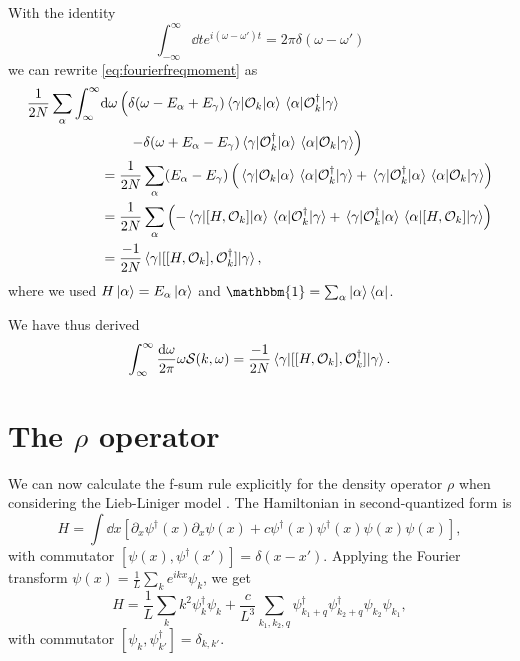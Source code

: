 \documentclass[11pt, a4paper]{report} %
\newcommand{\operator}{\mathcal{O}}
\begin{document}
With the identity
\begin{equation}
  \int_{-\infty}^{\infty} \dd t e^{i(\omega-\omega')t} = 2\pi \delta(\omega-\omega')
\end{equation}
we can rewrite \cref{eq:fourierfreqmoment} as 
\begin{align}
  \frac{1}{2N} \sum_{\alpha} \int_{\infty}^{\infty}&\dd \omega  \left(\delta(\omega-E_{\alpha}+E_{\gamma})\matrixel{\gamma}{\operator_k}{\alpha}\matrixel{\alpha}{\operator_{k}^{\dagger}}{\gamma}\right. \nonumber\\
&\qquad\left.- \delta(\omega+E_{\alpha}-E_{\gamma})\matrixel{\gamma}{\operator_{k}^{\dagger}}{\alpha}\matrixel{\alpha}{\operator_k}{\gamma}\right)\\
&=\frac{1}{2N} \sum_{\alpha} (E_{\alpha} - E_{\gamma}) \left(\matrixel{\gamma}{\operator_k}{\alpha}\matrixel{\alpha}{\operator_{k}^{\dagger}}{\gamma} + \matrixel{\gamma}{\operator_{k}^{\dagger}}{\alpha}\matrixel{\alpha}{\operator_k}{\gamma}\right)\\
&=\frac{1}{2N} \sum_{\alpha}  \left(-\matrixel{\gamma}{[H,\operator_k]}{\alpha}\matrixel{\alpha}{\operator_{k}^{\dagger}}{\gamma} + \matrixel{\gamma}{\operator_{k}^{\dagger}}{\alpha}\matrixel{\alpha}{[H,\operator_k]}{\gamma}\right)\\
&=\frac{-1}{2N} \matrixel{\gamma}{[[H,\operator_k],\operator_{k}^{\dagger}]}{\gamma},
\end{align}
where we used \(H\ket{\alpha}=E_{\alpha}\ket{\alpha}\) and \(\mathbbm{1}=\sum_{\alpha}\ket{\alpha}\bra{\alpha}\).

We have thus derived~\cite{Cauxfsum}
\begin{align}
  \int_{\infty}^{\infty}\frac{\dd \omega}{2\pi} \omega \mathcal{S}(k,\omega) = \frac{-1}{2N} \matrixel{\gamma}{[[H,\operator_k],\operator_{k}^{\dagger}]}{\gamma}.
\end{align}


\section{The $\rho$ operator}

\begin{sloppypar}
We can now calculate the f-sum rule explicitly for the density operator \(\rho\) when considering the Lieb-Liniger model \cite{Cauxfsum}.
The Hamiltonian in second-quantized form is \cite{Franchini2017} 
\begin{equation}
  \label{eq:1}
  H = \int \dd x \left[\partial_x\psi^{\dag}(x) \partial_{x} \psi(x) + c \psi^{\dag}(x)\psi^{\dag}(x)\psi(x)\psi(x)\right],
\end{equation}
with commutator \([\psi(x), \psi^{\dagger}(x')] = \delta(x-x')\).
Applying the Fourier transform \(\psi (x) = \frac{1}{L}\sum_{k} e^{ikx}\psi_k\), we get
\begin{equation}
  \label{eq:2}
  H = \frac{1}{L} \sum_k k^2 \psi^{\dagger}_{k}\psi_k +\frac{c}{L^3} \sum_{k_1,k_2,q} \psi^{\dag}_{k_1+q} \psi^{\dag}_{k_2+q} \psi_{k_2} \psi_{k_1},
\end{equation}
with commutator \([\psi_k,\psi_{k'}^{\dag}]=\delta_{k,k'}\).
\end{sloppypar}
\end{document}
